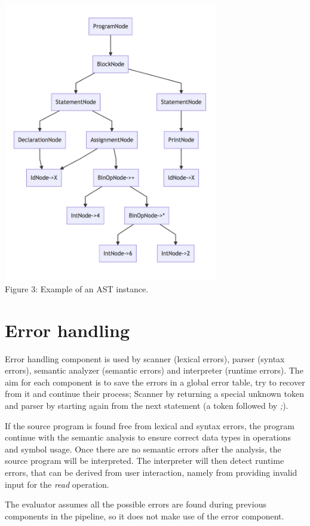 \documentclass[fleqn]{article}
\begin{document}
{\centering
    \vspace*{1cm} 
    \includegraphics[width=0.7\textwidth]{sample1}
    \\Figure 3: Example of an AST instance.\par
}


\newpage
\section{Error handling}
Error handling component is used by scanner (lexical errors), parser (syntax errors), semantic analyzer (semantic errors) and interpreter (runtime errors).
The aim for each component is to save the errors in a global error table, try to recover from it and continue their process;
Scanner by returning a special unknown token and parser by starting again from the next statement (a token followed by \textit{;}).
\par
If the source program is found free from lexical and syntax errors, the program continue with the semantic analysis to ensure correct data types in operations and symbol usage.
Once there are no semantic errors after the analysis, the source program will be interpreted.
The interpreter will then detect runtime errors, that can be derived from user interaction, namely from providing invalid input for the \textit{read} operation.
\par
The evaluator assumes all the possible errors are found during previous components in the pipeline, so it does not make use of the error component.
\end{document}
